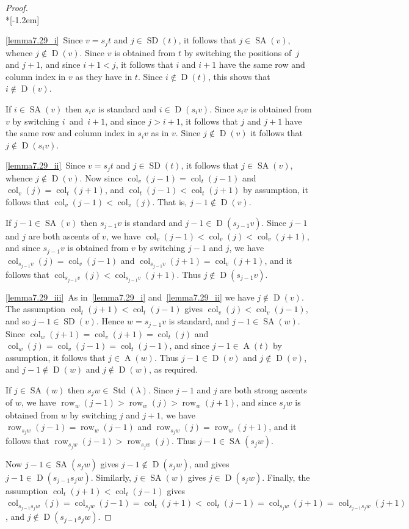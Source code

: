 \documentclass[10pt]{amsart}
\theoremstyle{definition}
\DeclareMathOperator{\row}{row}
\DeclareMathOperator{\col}{col}
\DeclareMathOperator{\STD}{Std}
\DeclareMathOperator{\SD}{SD}
\DeclareMathOperator{\SA}{SA}
\DeclareMathOperator{\D}{D}
\DeclareMathOperator{\A}{A}
\begin{document}
\begin{proof} \ \\*[-1.2em]

\ref{lemma7.29_i}~Since $v=s_jt$ and $j\in\SD(t)$, it follows that $j\in\SA(v)$,
whence $j\notin\D(v)$.
Since $v$ is obtained from $t$ by switching the positions of~$j$ and $j+1$,
and since $i+1<j$, it follows that $i$ and $i+1$ have the same row and column
index in $v$ as they have in $t$. Since $i\notin\D(t)$, this shows that
$i\notin\D(v)$.

If $i\in\SA(v)$ then $s_iv$ is standard and $i\in\D(s_iv)$.
Since $s_iv$ is obtained from $v$ by switching $i$~and~$i+1$,
and since $j>i+1$, it follows that $j$ and $j+1$ have the same row and column
index in $s_iv$ as in $v$. Since $j\notin\D(v)$ it follows
that $j\notin\D(s_iv)$.

\ref{lemma7.29_ii}~Since $v=s_jt$ and $j\in\SD(t)$, it follows that $j\in\SA(v)$,
whence $j\notin\D(v)$. Now since $\col_v(j-1)=\col_t(j-1)$ and $\col_v(j)=\col_t(j+1)$,
and $\col_t(j-1)<\col_t(j+1)$ by assumption, it follows that $\col_v(j-1)<\col_v(j)$.
That is, $j-1\notin\D(v)$.

If $j-1\in\SA(v)$ then $s_{j-1}v$ is standard and $j-1\in\D(s_{j-1}v)$.
Since $j-1$ and $j$ are both ascents of $v$, we have $\col_v(j-1)<\col_v(j)<\col_v(j+1)$,
and since $s_{j-1}v$ is obtained from $v$ by switching $j-1$ and $j$, we have
$\col_{s_{j-1}v}(j)=\col_v(j-1)$ and $\col_{s_{j-1}v}(j+1)=\col_v(j+1)$, and
it follows that $\col_{s_{j-1}v}(j)<\col_{s_{j-1}v}(j+1)$. Thus $j\notin\D(s_{j-1}v)$.

\ref{lemma7.29_iii}~As in~\ref{lemma7.29_i} and~\ref{lemma7.29_ii} we have $j\notin\D(v)$. The assumption $\col_t(j+1)<\col_t(j-1)$
gives $\col_v(j)<\col_v(j-1)$, and so $j-1\in\SD(v)$. Hence $w=s_{j-1}v$ is standard,
and $j-1\in\SA(w)$. Since $\col_w(j+1)=\col_v(j+1)=\col_t(j)$ and
$\col_w(j)=\col_v(j-1)=\col_t(j-1)$, and since $j-1\in\A(t)$ by assumption, it follows
that $j\in \A(w)$. Thus $j-1\in\D(v)$ and $j\notin\D(v)$, and $j-1\notin\D(w)$ and
$j\notin\D(w)$, as required.

If $j\in\SA(w)$ then $s_jw\in\STD(\lambda)$. Since $j-1$ and $j$ are both strong ascents of
$w$, we have $\row_w(j-1)>\row_w(j)>\row_w(j+1)$, and since $s_jw$ is obtained from $w$
by switching $j$ and $j+1$, we have $\row_{s_jw}(j-1)=\row_w(j-1)$ and
$\row_{s_jw}(j)=\row_w(j+1)$, and it follows that $\row_{s_jw}(j-1)>\row_{s_jw}(j)$.
Thus $j-1\in\SA(s_jw)$.

Now $j-1\in\SA(s_jw)$ gives $j-1\notin\D(s_jw)$, and gives
$j-1\in\D(s_{j-1}s_jw)$. Similarly, $j\in\SA(w)$ gives
$j\in\D(s_jw)$. Finally, the assumption $\col_t(j+1)<\col_t(j-1)$ gives
$\col_{s_{j-1}s_jw}(j)=\col_{s_jw}(j-1)=\col_t(j+1)<\col_t(j-1)=\col_{s_jw}(j+1)
=\col_{s_{j-1}s_jw}(j+1)$, and $j\notin\D(s_{j-1}s_jw)$.
\end{proof}
\end{document}
